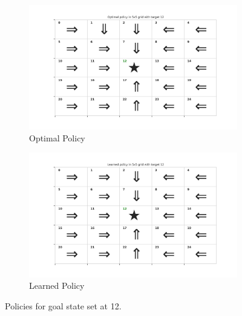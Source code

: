 \begin{figure}[!htbp]
    \centering
    \begin{subfigure}[b]{0.49\linewidth}
        \centering
        \includegraphics[width=\linewidth]{experimentation/images/Optimal policy in 5x5 grid with target 12.png}
        \caption{Optimal Policy}
    \end{subfigure}
    \begin{subfigure}[b]{0.49\linewidth}
        \centering
        \includegraphics[width=\linewidth]{experimentation/images/Learned policy in 5x5 grid with target 12.png}
        \caption{Learned Policy}
    \end{subfigure}
    \caption{Policies for goal state set at 12.}
    \label{fig:policy_12}
\end{figure}

